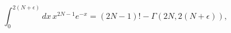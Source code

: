 \begin{equation}
\label{Eq_A24}
\int^{2(N+\epsilon)}_0 dx \, x^{2N-1} e^{-x} = (2N-1)!
  - \Gamma(2N,2(N+\epsilon)),
\end{equation}

